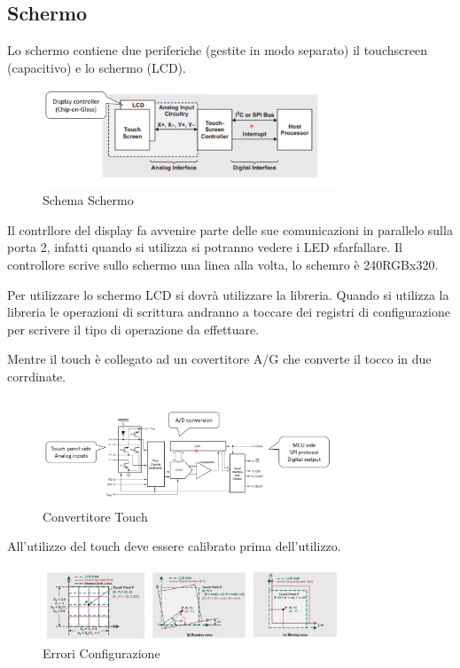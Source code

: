 \documentclass[12pt]{article}
\begin{document}
\subsection{Schermo}
Lo schermo contiene due periferiche (gestite in modo separato) il touchscreen (capacitivo) e lo schermo (LCD).
\begin{figure}[H]
    \centering
    \includegraphics[width=0.8\textwidth]{schema-schermo.png}
    \caption{Schema Schermo}
    \label{fig:schema-schermo}
\end{figure}

Il contrllore del display fa avvenire parte delle sue comunicazioni in parallelo sulla porta 2, infatti quando si utilizza si potranno vedere i LED sfarfallare. Il controllore scrive sullo schermo una linea alla volta, lo schemro \`e 240RGBx320.


Per utilizzare lo schermo LCD si dovr\`a utilizzare la libreria. Quando si utilizza la libreria le operazioni di scrittura andranno a toccare dei registri di configurazione per scrivere il tipo di operazione da effettuare.

Mentre il touch \`e collegato ad un covertitore A/G che converte il tocco in due corrdinate.
\begin{figure}[H]
    \centering
    \includegraphics[width=0.8\textwidth]{convertitore-touch.png}
    \caption{Convertitore Touch}
    \label{fig:convertitore-touch}
\end{figure}
All'utilizzo del touch deve essere calibrato prima dell'utilizzo.
\begin{figure}[H]
    \centering
    \includegraphics[width=0.8\textwidth]{errori-configurazione.png}
    \caption{Errori Configurazione}
    \label{fig:errori-configurazione}
\end{figure}
\end{document}
